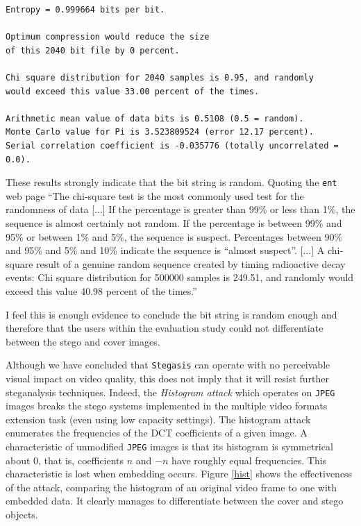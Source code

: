 \documentclass[paper=a4, fontsize=11pt,twoside]{scrartcl}
\numberwithin{table}{section}
\numberwithin{figure}{section}
\numberwithin{algorithm}{section}
\begin{document}
\begin{lstlisting}[language={},caption={Output of \texttt{ent}.},frame=single, upquote=true,label=entout,showstringspaces=false]
Entropy = 0.999664 bits per bit.

Optimum compression would reduce the size
of this 2040 bit file by 0 percent.

Chi square distribution for 2040 samples is 0.95, and randomly
would exceed this value 33.00 percent of the times.

Arithmetic mean value of data bits is 0.5108 (0.5 = random).
Monte Carlo value for Pi is 3.523809524 (error 12.17 percent).
Serial correlation coefficient is -0.035776 (totally uncorrelated = 0.0).
\end{lstlisting}

These results strongly indicate that the bit string is random. Quoting the \texttt{ent} web page ``The chi-square test is the most commonly used test for the randomness of data [...] If the percentage is greater than 99\% or less than 1\%, the sequence is almost certainly not random. If the percentage is between 99\% and 95\% or between 1\% and 5\%, the sequence is suspect. Percentages between 90\% and 95\% and 5\% and 10\% indicate the sequence is ``almost suspect''. [...] A chi-square result of a genuine random sequence created by timing radioactive decay events: Chi square distribution for 500000 samples is 249.51, and randomly would exceed this value 40.98 percent of the times.''

I feel this is enough evidence to conclude the bit string is random enough and therefore that the users within the evaluation study could not differentiate between the stego and cover images.

Although we have concluded that \texttt{Stegasis} can operate with no perceivable visual impact on video quality, this does not imply that it will resist further steganalysis techniques. Indeed, the \textit{Histogram attack} which operates on \texttt{JPEG} images breaks the stego systems implemented in the multiple video formats extension task (even using low capacity settings). The histogram attack enumerates the frequencies of the DCT coefficients of a given image. A characteristic of unmodified \texttt{JPEG} images is that its histogram is symmetrical about 0, that is, coefficients $n$ and $-n$ have roughly equal frequencies. This characteristic is lost when embedding occurs. Figure \ref{hist} shows the effectiveness of the attack, comparing the histogram of an original video frame to one with embedded data. It clearly manages to differentiate between the cover and stego objects.
\end{document}
